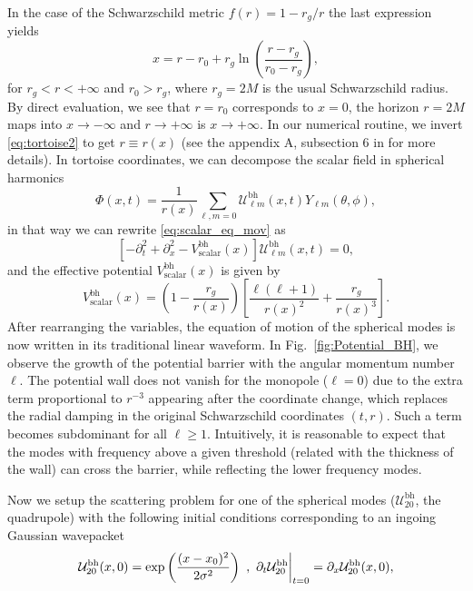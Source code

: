 \documentclass[article,aps,nofootinbib,twocolumn,superscriptaddress]{revtex4-1}
\begin{document}
In the case of the Schwarzschild metric $f(r)=1-r_g/r$ the last expression yields
\begin{equation}
x=r-r_0+r_g\ln\left(\frac{r-r_g}{r_0-r_g}\right),
\label{eq:tortoise2}
\end{equation} 
for $r_g<r<+\infty$ and $r_0>r_g$, where $r_g=2M$ is the usual Schwarzschild radius. By direct evaluation, we see that $r=r_0$ corresponds to $x=0$, the horizon $r=2M$ maps into $x\rightarrow-\infty$ and $r\rightarrow+\infty$ is $x\rightarrow+\infty$. In our numerical routine, we invert \eqref{eq:tortoise2} to get $r\equiv r(x)$ (see the appendix A, subsection 6 in \citep{Frolov:2017asg} for more details). In tortoise coordinates, we can decompose the scalar field in spherical harmonics 
\begin{equation}
\Phi(x,t)=\frac{1}{r(x)}\sum_{\ell,m=0}\mathcal{U}^{\mathrm{bh}}_{\ell m}(x,t)Y_{\ell m}(\theta,\phi),
\label{eq:ylm_decomp}
\end{equation}
in that way we can rewrite \eqref{eq:scalar_eq_mov} as
\begin{equation}
\left[-\partial_t^2+\partial_x^2-V^{\mathrm{bh}}_{\mathrm{scalar}}(x)\right]\mathcal{U}^{\mathrm{bh}}_{\ell m}(x,t) = 0,
\label{eq:wave_scalar}
\end{equation}
and the effective potential $V^{\mathrm{bh}}_{\mathrm{scalar}}(x)$ is given by
\begin{equation}
V^{\mathrm{bh}}_{\mathrm{scalar}}(x) = \left(1-\frac{r_g}{r(x)}\right)\left[\frac{\ell(\ell+1)}{r(x)^2}+\frac{r_g}{r(x)^3}\right].
\end{equation}
After rearranging the variables, the equation of motion of the spherical modes is now written in its traditional linear waveform. In Fig.~\ref{fig:Potential_BH}, we observe the growth of the potential barrier with the angular momentum number $\ell$. The potential wall does not vanish for the monopole ($\ell=0$) due to the extra term proportional to $r^{-3}$ appearing after the coordinate change, which replaces the radial damping in the original Schwarzschild coordinates $(t,r)$. Such a term becomes subdominant for all $\ell\geq 1$. Intuitively, it is reasonable to expect that the modes with frequency above a given threshold (related with the thickness of the wall) can cross the barrier, while reflecting the lower frequency modes. 

Now we setup the scattering problem for one of the spherical modes ($\mathcal{U}^{\mathrm{bh}}_{20}$, the quadrupole) with the following initial conditions corresponding to an ingoing Gaussian wavepacket 
\begin{equation}
\mathcal{U}^{\mathrm{bh}}_{20}(x,0)=\exp\left(\frac{(x-x_0)^2}{2\sigma^2}\right)~,~ \partial_t\mathcal{U}^{\mathrm{bh}}_{20}\bigg{|}_{t=0}=\partial_x \mathcal{U}^{\mathrm{bh}}_{20}(x,0),
\label{eq:scalar_init_cond}
\end{equation}
\end{document}
